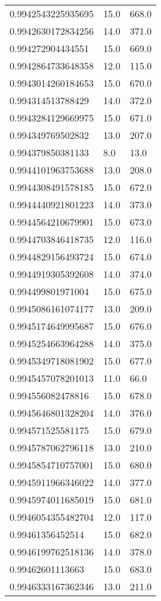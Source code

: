 \begin{center}
\begin{supertabular}[H]{p{0.30\textwidth}p{0.05\textwidth}p{0.05\textwidth}}
0.9942543225935695 & 15.0 & 668.0 \\ 
0.9942630172834256 & 14.0 & 371.0 \\ 
0.994272904434551 & 15.0 & 669.0 \\ 
0.9942864733648358 & 12.0 & 115.0 \\ 
0.9943014260184653 & 15.0 & 670.0 \\ 
0.994314513788429 & 14.0 & 372.0 \\ 
0.9943284129669975 & 15.0 & 671.0 \\ 
0.994349769502832 & 13.0 & 207.0 \\ 
0.994379850381133 & 8.0 & 13.0 \\ 
0.9944101963753688 & 13.0 & 208.0 \\ 
0.9944308491578185 & 15.0 & 672.0 \\ 
0.9944440921801223 & 14.0 & 373.0 \\ 
0.9944564210679901 & 15.0 & 673.0 \\ 
0.9944703846418735 & 12.0 & 116.0 \\ 
0.9944829156493724 & 15.0 & 674.0 \\ 
0.9944919305392608 & 14.0 & 374.0 \\ 
0.994499801971004 & 15.0 & 675.0 \\ 
0.9945086161074177 & 13.0 & 209.0 \\ 
0.9945174649995687 & 15.0 & 676.0 \\ 
0.9945254663964288 & 14.0 & 375.0 \\ 
0.9945349718081902 & 15.0 & 677.0 \\ 
0.9945457078201013 & 11.0 & 66.0 \\ 
0.994556082478816 & 15.0 & 678.0 \\ 
0.9945646801328204 & 14.0 & 376.0 \\ 
0.994571525581175 & 15.0 & 679.0 \\ 
0.9945787062796118 & 13.0 & 210.0 \\ 
0.9945854710757001 & 15.0 & 680.0 \\ 
0.9945911966346022 & 14.0 & 377.0 \\ 
0.9945974011685019 & 15.0 & 681.0 \\ 
0.9946054355482704 & 12.0 & 117.0 \\ 
0.99461356452514 & 15.0 & 682.0 \\ 
0.9946199762518136 & 14.0 & 378.0 \\ 
0.99462601113663 & 15.0 & 683.0 \\ 
0.9946333167362346 & 13.0 & 211.0 \\ 

\end{supertabular}
\end{center}
